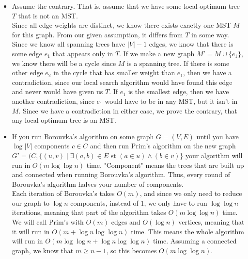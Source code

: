 \documentclass[11pt]{article}
\begin{document}
\begin{solution}
    \begin{itemize}
        \item Assume the contrary. That is, assume that we have some local-optimum tree $T$ that is not an MST. 
            \\ Since all edge weights are distinct, we know there exists exactly one MST $M$ for this graph. 
            From our given assumption, it differs from $T$ in some way. Since we know all spanning trees have $|V| - 1$ edges, 
            we know that there is some edge $e_1$ that appears only in $T$. If we make a new graph $M' = M \cup \{e_1\}$, we know there
            will be a cycle since $M$ is a spanning tree. If there is some other edge $e_2$ in the cycle that has smaller weight 
            than $e_1$, then we have a contradiction, since our local search algorithm would have found this edge and never would have
            given us $T$. If $e_1$ is the smallest edge, then we have another contradiction, since $e_1$ would have to be in any MST, 
            but it isn't in $M$. Since we have a contradiction in either case, we prove the contrary, that any local-optimum tree is an MST.
        \item If you run Borouvka's algorithm on some graph $G = (V, E)$ until you have $\log |V|$ components $c \in C$ and then run Prim's algorithm on the new graph $G' = (C, \{(u, v) \mid \exists (a, b) \in E \text{ st } (a \in u) \land (b \in v)\}$ your algorithm will run
            in $O(m\log\log n)$ time. 
            "Component" means the trees that are built up and connected when running Borouvka's algorithm. Thus, every round of Borouvka's algorithm halves your number of components. 
            \\ Each iteration of Borouvka's takes $O(m)$, and since we only need to reduce our graph to $\log n$ components,
            instead of $1$, we only have to run $\log \log n$ iterations,
            meaning that part of the algorithm takes $O(m \log \log n)$ time. We will call Prim's with $O(m)$ edges and $O(\log n)$ vertices, meaning that it will run in $O(m + \log n \log \log n)$ time.
            This means the whole algorithm will run in $O(m \log \log n + \log n \log \log n)$ time. Assuming a connected graph, we know that $m \geq n - 1$,
            so this becomes $O(m \log \log n)$.
    \end{itemize}
\end{solution}

\end{document}
